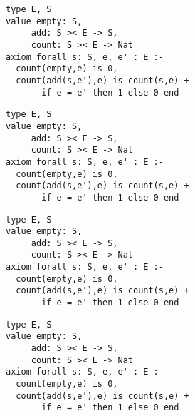 \z \begin{lstlisting}
type E, S
value empty: S,
     add: S >< E -> S,
     count: S >< E -> Nat
axiom forall s: S, e, e' : E :-
  count(empty,e) is 0,
  count(add(s,e'),e) is count(s,e) +
       if e = e' then 1 else 0 end
\end{lstlisting}

\MediumPicture{}


\z \begin{lstlisting}
type E, S
value empty: S,
     add: S >< E -> S,
     count: S >< E -> Nat
axiom forall s: S, e, e' : E :-
  count(empty,e) is 0,
  count(add(s,e'),e) is count(s,e) +
       if e = e' then 1 else 0 end
\end{lstlisting}

\MediumPicture{}


\z \begin{lstlisting}
type E, S
value empty: S,
     add: S >< E -> S,
     count: S >< E -> Nat
axiom forall s: S, e, e' : E :-
  count(empty,e) is 0,
  count(add(s,e'),e) is count(s,e) +
       if e = e' then 1 else 0 end
\end{lstlisting}

\MediumPicture{}


\z \begin{lstlisting}
type E, S
value empty: S,
     add: S >< E -> S,
     count: S >< E -> Nat
axiom forall s: S, e, e' : E :-
  count(empty,e) is 0,
  count(add(s,e'),e) is count(s,e) +
       if e = e' then 1 else 0 end
\end{lstlisting}

\MediumPicture{}



